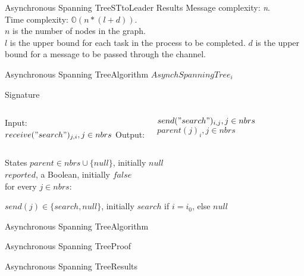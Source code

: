\documentclass[pdf]{beamer}
\begin{document}
\begin{frame}{Asynchronous Spanning Tree}{STtoLeader Results}
    Message complexity: \emph{n}.\\
    Time complexity: $\mathbb{O}(n*(l+d))$.\\
    \vspace{12pt}
    $n$ is the number of nodes in the graph.\\
    $l$ is the upper bound for each task in the process to be completed.
    $d$ is the upper bound for a message to be passed through the channel.
\end{frame}

\begin{frame}{Asynchronous Spanning Tree}{Algorithm}
	$AsynchSpanningTree_i$
    \begin{block}{Signature}
        \begin{columns}
            Input:\\
            \hspace*{\parindent} 
              {$receive("search")_{j,i}, j \in nbrs$}
            Output:
            \hspace*{\parindent}
            \parbox{\textwidth}{$send("search")_{i,j}, j \in nbrs$\\
               $parent(j)_i, j \in nbrs$}
        \end{columns}
    \end{block}
    \begin{block}{States}
        $parent \in nbrs \cup \{null\}$, initially $null$\\
        $reported$, a Boolean, initially $false$\\
        for every $j \in nbrs$:\\
        \hspace*{\parindent}
        \parbox{\textwidth}{$send(j) \in \{search,null\}$,
        initially $search$ if $i=i_0$, else $null$}
    \end{block}
\end{frame}

\begin{frame}{Asynchronous Spanning Tree}{Algorithm}
\end{frame}

\begin{frame}{Asynchronous Spanning Tree}{Proof}
	
	
\end{frame}
\begin{frame}{Asynchronous Spanning Tree}{Results}
	
	
\end{frame}
\end{document}

